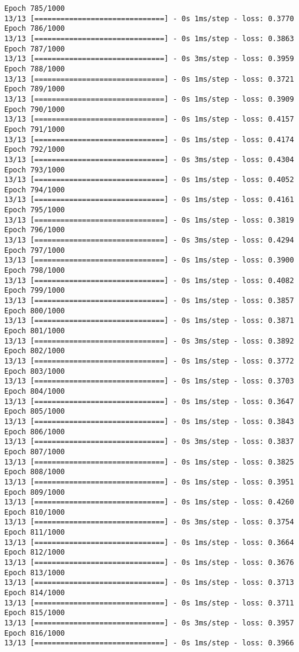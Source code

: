 \documentclass[11pt]{article}
\begin{document}
\begin{Verbatim}[commandchars=\\\{\}]
Epoch 785/1000
13/13 [==============================] - 0s 1ms/step - loss: 0.3770
Epoch 786/1000
13/13 [==============================] - 0s 1ms/step - loss: 0.3863
Epoch 787/1000
13/13 [==============================] - 0s 3ms/step - loss: 0.3959
Epoch 788/1000
13/13 [==============================] - 0s 1ms/step - loss: 0.3721
Epoch 789/1000
13/13 [==============================] - 0s 1ms/step - loss: 0.3909
Epoch 790/1000
13/13 [==============================] - 0s 1ms/step - loss: 0.4157
Epoch 791/1000
13/13 [==============================] - 0s 1ms/step - loss: 0.4174
Epoch 792/1000
13/13 [==============================] - 0s 3ms/step - loss: 0.4304
Epoch 793/1000
13/13 [==============================] - 0s 1ms/step - loss: 0.4052
Epoch 794/1000
13/13 [==============================] - 0s 1ms/step - loss: 0.4161
Epoch 795/1000
13/13 [==============================] - 0s 1ms/step - loss: 0.3819
Epoch 796/1000
13/13 [==============================] - 0s 3ms/step - loss: 0.4294
Epoch 797/1000
13/13 [==============================] - 0s 1ms/step - loss: 0.3900
Epoch 798/1000
13/13 [==============================] - 0s 1ms/step - loss: 0.4082
Epoch 799/1000
13/13 [==============================] - 0s 1ms/step - loss: 0.3857
Epoch 800/1000
13/13 [==============================] - 0s 1ms/step - loss: 0.3871
Epoch 801/1000
13/13 [==============================] - 0s 3ms/step - loss: 0.3892
Epoch 802/1000
13/13 [==============================] - 0s 1ms/step - loss: 0.3772
Epoch 803/1000
13/13 [==============================] - 0s 1ms/step - loss: 0.3703
Epoch 804/1000
13/13 [==============================] - 0s 1ms/step - loss: 0.3647
Epoch 805/1000
13/13 [==============================] - 0s 1ms/step - loss: 0.3843
Epoch 806/1000
13/13 [==============================] - 0s 3ms/step - loss: 0.3837
Epoch 807/1000
13/13 [==============================] - 0s 1ms/step - loss: 0.3825
Epoch 808/1000
13/13 [==============================] - 0s 1ms/step - loss: 0.3951
Epoch 809/1000
13/13 [==============================] - 0s 1ms/step - loss: 0.4260
Epoch 810/1000
13/13 [==============================] - 0s 3ms/step - loss: 0.3754
Epoch 811/1000
13/13 [==============================] - 0s 1ms/step - loss: 0.3664
Epoch 812/1000
13/13 [==============================] - 0s 1ms/step - loss: 0.3676
Epoch 813/1000
13/13 [==============================] - 0s 1ms/step - loss: 0.3713
Epoch 814/1000
13/13 [==============================] - 0s 1ms/step - loss: 0.3711
Epoch 815/1000
13/13 [==============================] - 0s 3ms/step - loss: 0.3957
Epoch 816/1000
13/13 [==============================] - 0s 1ms/step - loss: 0.3966

\end{Verbatim}
\end{document}
